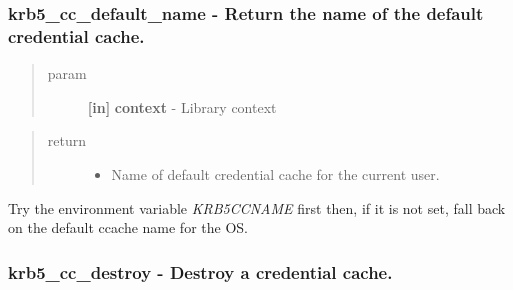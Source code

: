 \documentclass[letterpaper,10pt,english]{sphinxmanual}
\begin{document}
\subsubsection{krb5\_cc\_default\_name -  Return the name of the default credential cache.}
\label{appdev/refs/api/krb5_cc_default_name::doc}\label{appdev/refs/api/krb5_cc_default_name:krb5-cc-default-name-return-the-name-of-the-default-credential-cache}

\begin{fulllineitems}
\label{appdev/refs/api/krb5_cc_default_name:krb5_cc_default_name}
\end{fulllineitems}

\begin{quote}\begin{description}
\item[{param}] \leavevmode
\textbf{{[}in{]}} \textbf{context} - Library context

\end{description}\end{quote}
\begin{quote}\begin{description}
\item[{return}] \leavevmode\begin{itemize}
\item {} 
Name of default credential cache for the current user.

\end{itemize}

\end{description}\end{quote}

Try the environment variable \emph{KRB5CCNAME} first then, if it is not set, fall back on the default ccache name for the OS.


\subsubsection{krb5\_cc\_destroy -  Destroy a credential cache.}
\label{appdev/refs/api/krb5_cc_destroy:krb5-cc-destroy-destroy-a-credential-cache}\label{appdev/refs/api/krb5_cc_destroy::doc}

\begin{fulllineitems}
\label{appdev/refs/api/krb5_cc_destroy:krb5_cc_destroy}
\end{fulllineitems}
\end{document}
